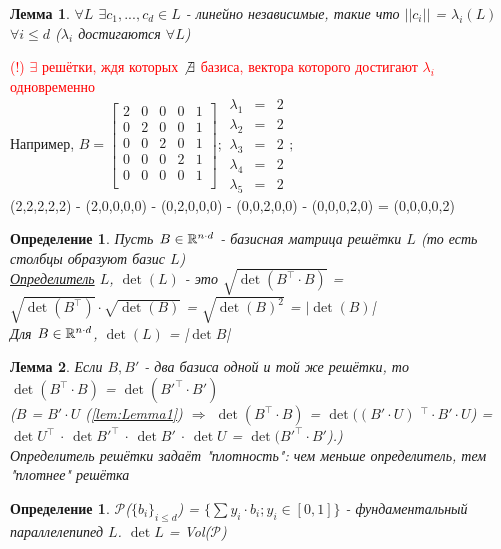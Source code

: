 \documentclass[11pt]{article}
\newtheorem{lemma}{Лемма} %
\newtheorem{definition}[theorem]{Определение}
\begin{document}
\begin{lemma} \label{lem:Lemma3}
	$\forall L$ $\exists c_1, ..., c_d \in L$ - линейно независимые, такие что $||c_i||$ = $\lambda_i(L)$ $\forall i \leq d$
	($\lambda_i$ достигаются $\forall L$)
\end{lemma}

\textcolor{red}{(!) $\exists$ решётки, ждя которых $\not\exists$ базиса, вектора которого достигают $\lambda_i$ одновременно}\\
Например, $	B = \begin{bmatrix}
	2 & 0 & 0 & 0 & 1 \\
	0 & 2 & 0 & 0 & 1 \\
	0 & 0 & 2 & 0 & 1 \\
	0 & 0 & 0 & 2 & 1 \\
	0 & 0 & 0 & 0 & 1 \\
	\end{bmatrix}; \begin{array}{rcl}
	\lambda_1 & = & 2 \\
	\lambda_2 & = & 2 \\
	\lambda_3 & = & 2 \\
	\lambda_4 & = & 2 \\
	\lambda_5 & = & 2
	\end{array};$\\
	(2,2,2,2,2) - (2,0,0,0,0) - (0,2,0,0,0) - (0,0,2,0,0) - (0,0,0,2,0) =  (0,0,0,0,2)

\begin{definition} \label{thm:Determinant}
	Пусть $B \in {{\mathbb R}}^{n \cdot d}$ - базисная матрица решётки $L$ (то есть столбцы образуют базис $L$)\\
	\underline{Определитель} $L$, $\det{(L)}$ - это $\sqrt{\det{(B^\intercal \cdot B)}}$ = $\sqrt{\det{(B^\intercal)} } \cdot \sqrt{\det{(B)}}$ = $\sqrt{\det{(B)^2}}$ = $|\det{(B)}$|\\
	Для $B \in {{\mathbb R}}^{n \cdot d}$, $\det{(L)}$ = |$\det{B}$|
\end{definition}

\begin{lemma} \label{lem:Lemma4}
	Если $B, B'$ - два базиса одной и той же решётки, то \\
	$\det{(B^\intercal \cdot B)}$ = $\det{(B'^\intercal \cdot B')}$\\
	($B$ = $B' \cdot U$ (\ref{lem:Lemma1}) $\Rightarrow$ $\det{(B^\intercal \cdot B)}$ = $\det{((B' \cdot U)}$ $^\intercal \cdot B' \cdot U$) = $\det{U^\intercal}$ $\cdot$ $\det{B'^\intercal}$ $\cdot$ $\det{B'}$ $\cdot$ $\det{U}$ = $\det{(B'^\intercal \cdot B'}$).)\\
	Определитель решётки задаёт "плотность": чем меньше определитель, тем "плотнее" решётка
\end{lemma}

\begin{definition} \label{thm:Par}
	$\mathcal{P}$\big($\{b_i\}_{i \leq d}$\big) = $\big\{ \sum y_i \cdot b_i ; y_i \in [0,1] \big\}$ - фундаментальный параллелепипед $L$.
	$\det{L}$ = Vol\big($\mathcal{P}$\big)
\end{definition}
\end{document}
